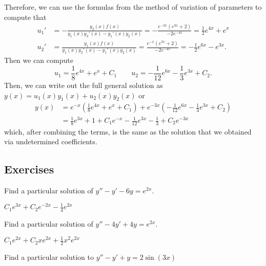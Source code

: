 \begin{exampleSol}
Therefore, we can use the formulas from the method of variation of parameters to compute that
\begin{equation*}
\begin{split}
u_1' &= -\frac{y_2(x)f(x)}{y_1(x)y_2'(x) - y_1'(x)y_2(x)} = -\frac{e^{-3x}(e^{3x} + 2)}{-2e^{-4x}} = \frac{1}{2}e^{4x} + e^x \\
u_2' &= \frac{y_1(x)f(x)}{y_1(x)y_2'(x) - y_1'(x)y_2(x)} = \frac{e^{-x}(e^{3x} + 2)}{-2e^{-4x}} = -\frac{1}{2}e^{6x} - e^{3x}.
\end{split}
\end{equation*} 
Then we can compute
\begin{equation*}
u_1 = \frac{1}{8}e^{4x} + e^x + C_1 \qquad u_2 = -\frac{1}{12}e^{6x} - \frac{1}{3}e^{3x} + C_2.
\end{equation*}
Then, we can write out the full general solution as $y(x) = u_1(x)y_1(x) + u_2(x)y_2(x)$ or
\begin{equation*}
\begin{split}
y(x) &= e^{-x}\left( \frac{1}{8}e^{4x} + e^x + C_1 \right) + e^{-3x}\left(-\frac{1}{12}e^{6x} - \frac{1}{3}e^{3x} + C_2 \right) \\
&= \frac{1}{8}e^{3x} + 1 + C_1e^{-x} - \frac{1}{12}e^{3x} - \frac{1}{3} + C_2e^{-3x}
\end{split}
\end{equation*}
which, after combining the terms, is the same as the solution that we obtained via undetermined coefficients.
\end{exampleSol}

\subsection{Exercises}

\begin{exercise}
Find a particular solution of
$y''-y' -6y = e^{2x}$.
\end{exercise}
\comboSol{%
}
{%
$C_1e^{3x} + C_2e^{-2x} - \frac{1}{4}e^{2x}$
}

\begin{exercise}
Find a particular solution of
$y''-4y' +4y = e^{2x}$.
\end{exercise}
\comboSol{%
}
{%
$C_1e^{2x} + C_2xe^{2x} + \frac{1}{2}x^2e^{2x}$
}

\begin{exercise}\ansMark%
Find a particular solution to $y''-y'+y=2\sin(3x)$
\end{exercise}


